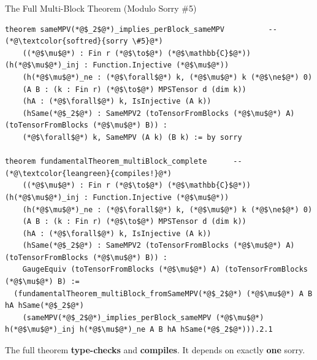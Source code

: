 \documentclass[aspectratio=169,10pt]{beamer}
\begin{document}
\begin{frame}[fragile]{The Full Multi-Block Theorem (Modulo Sorry \#5)}
\vspace{-0.5em}
\begin{lstlisting}[basicstyle=\ttfamily\fontsize{5.5}{7}\selectfont\color{white}]
theorem sameMPV(*@$_2$@*)_implies_perBlock_sameMPV          -- (*@\textcolor{softred}{sorry \#5}@*)
    ((*@$\mu$@*) : Fin r (*@$\to$@*) (*@$\mathbb{C}$@*)) (h(*@$\mu$@*)_inj : Function.Injective (*@$\mu$@*))
    (h(*@$\mu$@*)_ne : (*@$\forall$@*) k, (*@$\mu$@*) k (*@$\ne$@*) 0)
    (A B : (k : Fin r) (*@$\to$@*) MPSTensor d (dim k))
    (hA : (*@$\forall$@*) k, IsInjective (A k))
    (hSame(*@$_2$@*) : SameMPV2 (toTensorFromBlocks (*@$\mu$@*) A) (toTensorFromBlocks (*@$\mu$@*) B)) :
    (*@$\forall$@*) k, SameMPV (A k) (B k) := by sorry

theorem fundamentalTheorem_multiBlock_complete      -- (*@\textcolor{leangreen}{compiles!}@*)
    ((*@$\mu$@*) : Fin r (*@$\to$@*) (*@$\mathbb{C}$@*)) (h(*@$\mu$@*)_inj : Function.Injective (*@$\mu$@*))
    (h(*@$\mu$@*)_ne : (*@$\forall$@*) k, (*@$\mu$@*) k (*@$\ne$@*) 0)
    (A B : (k : Fin r) (*@$\to$@*) MPSTensor d (dim k))
    (hA : (*@$\forall$@*) k, IsInjective (A k))
    (hSame(*@$_2$@*) : SameMPV2 (toTensorFromBlocks (*@$\mu$@*) A) (toTensorFromBlocks (*@$\mu$@*) B)) :
    GaugeEquiv (toTensorFromBlocks (*@$\mu$@*) A) (toTensorFromBlocks (*@$\mu$@*) B) :=
  (fundamentalTheorem_multiBlock_fromSameMPV(*@$_2$@*) (*@$\mu$@*) A B hA hSame(*@$_2$@*)
    (sameMPV(*@$_2$@*)_implies_perBlock_sameMPV (*@$\mu$@*) h(*@$\mu$@*)_inj h(*@$\mu$@*)_ne A B hA hSame(*@$_2$@*))).2.1
\end{lstlisting}

\vspace{0.1em}
\begin{center}
{\small The full theorem \textbf{type-checks} and \textbf{compiles}. It depends on exactly \textbf{one} sorry.}
\end{center}
\end{frame}
\end{document}

